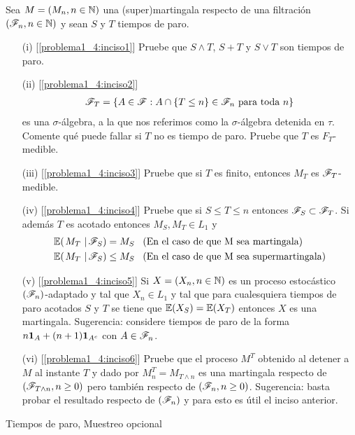 \begin{problema}
	Sea $M=\left( M_n,n\in\mathbb{N}\right) $ una (super)martingala respecto de una filtraci\'on $\left( \mathscr{F}_n,n\in\mathbb{N}\right) $ y sean $S$ y $T$ tiempos de paro.
	
	\begin{enumerate}
					\item[(i)]	[\ref{problema1_4:inciso1}] 
						Pruebe que $S\wedge T$, $S+T$ y $S\vee T$ son tiempos de paro.
					
					\item[(ii)]	[\ref{problema1_4:inciso2}]
						\begin{align}
							\mathscr{F}_T=\left\{ A\in\mathscr{F}:A\cap\left\{ T\leq n\right\} \in\mathscr{F}_n\text{ para toda } n\right\} 
						\end{align}
						es una $\sigma$-\'algebra, a la que nos referimos como la $\sigma$-\'algebra 
						detenida en $\tau$. Comente qu\'e puede fallar si $T$ no es tiempo de paro. 
						Pruebe que $T$ es $F_T$-medible. 
					
					\item[(iii)][\ref{problema1_4:inciso3}] 
						Pruebe que si $T$ es finito, entonces $M_T$ es $\mathscr{F}_T$-medible.
					
					\item[(iv)]	[\ref{problema1_4:inciso4}] 
						Pruebe que si $S\leq T\leq n$ entonces $\mathscr{F}_S\subset\mathscr{F}_T$. Si adem\'as $T$ es acotado entonces $M_S, M_T\in L_1$ y 
						\begin{align}
							\espc{M_T}{\F_S} = M_S &\mbox{\;\;\;(En el caso de que M sea martingala)} \\
							\espc{M_T}{\F_S}\leq M_S &\mbox{\;\;\;(En el caso de que M sea supermartingala)}                 	
						\end{align}

					\item[(v)]	[\ref{problema1_4:inciso5}]
						Si $X=\left( X_n,n\in\mathbb{N}\right) $ es un proceso estoc\'astico $\left( \mathscr{F}_n\right) $-adaptado y tal que $X_n\in L_1$ y tal que 
						para cualesquiera tiempos de paro acotados $S$ y $T$ se tiene que $\mathbb{E}\! \left( X_S \right)=\mathbb{E}\! \left( X_T \right)$ entonces $X$ es una 
						martingala. Sugerencia: considere tiempos de paro de la forma $n{\bf{1}}_{A}+(n+1){\bf{1}}_{A^c}$ con $A\in\mathscr{F}_n$.
						
					\item[(vi)]	[\ref{problema1_4:inciso6}]
						Pruebe que el proceso $M^T$ obtenido al detener a $M$ al instante $T$ y dado por $M^T_n=M_{T\wedge n}$ es una 
						martingala respecto de $\left( \mathscr{F}_{T\wedge n},n\geq 0\right) $ pero tambi\'en respecto de $\left( \mathscr{F}_{n},n\geq 0\right) $. 
						Sugerencia: basta probar el resultado respecto de $\left( \mathscr{F}_n\right) $ y para esto es \'util el inciso anterior.
	\end{enumerate}

Tiempos de paro, Muestreo opcional
\end{problema}


